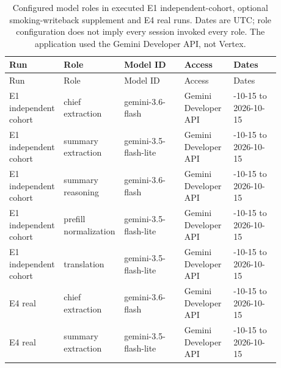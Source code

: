 \begingroup\small\setlength{\tabcolsep}{3pt}\renewcommand{\arraystretch}{1.15}
\begin{longtable}{>{\raggedright\arraybackslash}p{0.15\linewidth}>{\raggedright\arraybackslash}p{0.16\linewidth}>{\raggedright\arraybackslash}p{0.22\linewidth}>{\raggedright\arraybackslash}p{0.18\linewidth}>{\raggedright\arraybackslash}p{0.17\linewidth}}
\caption{Configured model roles in executed E1 independent-cohort, optional smoking-writeback supplement and E4 real runs. Dates are UTC; role configuration does not imply every session invoked every role. The application used the Gemini Developer API, not Vertex.}\label{sup:executedroles}\\\hline
Run & Role & Model ID & Access & Dates \\ \hline
\endfirsthead
\hline
Run & Role & Model ID & Access & Dates \\ \hline
\endhead
\hline\endfoot
\hline\endlastfoot
E1 independent cohort & chief extraction & gemini-\allowbreak{}3.\allowbreak{}6-\allowbreak{}flash & Gemini Developer API & 2026-\allowbreak{}10-\allowbreak{}15 to 2026-\allowbreak{}10-\allowbreak{}15 \\
E1 independent cohort & summary extraction & gemini-\allowbreak{}3.\allowbreak{}5-\allowbreak{}flash-\allowbreak{}lite & Gemini Developer API & 2026-\allowbreak{}10-\allowbreak{}15 to 2026-\allowbreak{}10-\allowbreak{}15 \\
E1 independent cohort & summary reasoning & gemini-\allowbreak{}3.\allowbreak{}6-\allowbreak{}flash & Gemini Developer API & 2026-\allowbreak{}10-\allowbreak{}15 to 2026-\allowbreak{}10-\allowbreak{}15 \\
E1 independent cohort & prefill normalization & gemini-\allowbreak{}3.\allowbreak{}5-\allowbreak{}flash-\allowbreak{}lite & Gemini Developer API & 2026-\allowbreak{}10-\allowbreak{}15 to 2026-\allowbreak{}10-\allowbreak{}15 \\
E1 independent cohort & translation & gemini-\allowbreak{}3.\allowbreak{}5-\allowbreak{}flash-\allowbreak{}lite & Gemini Developer API & 2026-\allowbreak{}10-\allowbreak{}15 to 2026-\allowbreak{}10-\allowbreak{}15 \\
E4 real & chief extraction & gemini-\allowbreak{}3.\allowbreak{}6-\allowbreak{}flash & Gemini Developer API & 2026-\allowbreak{}10-\allowbreak{}15 to 2026-\allowbreak{}10-\allowbreak{}15 \\
E4 real & summary extraction & gemini-\allowbreak{}3.\allowbreak{}5-\allowbreak{}flash-\allowbreak{}lite & Gemini Developer API & 2026-\allowbreak{}10-\allowbreak{}15 to 2026-\allowbreak{}10-\allowbreak{}15 \\

\end{longtable}

